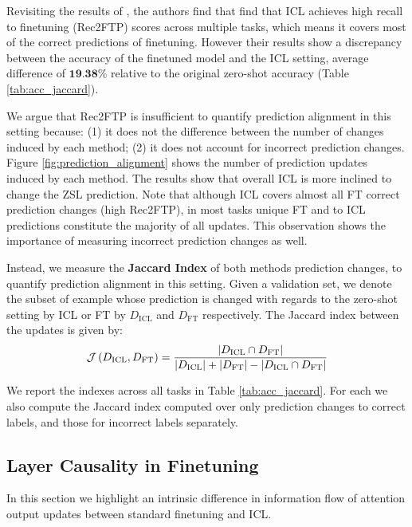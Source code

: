 Revisiting the results of \cite{dai2023gpt}, the authors find that find that ICL achieves high recall to finetuning (Rec2FTP) scores across multiple tasks, which means it covers most of the correct predictions of finetuning. 
However their results show a discrepancy between the accuracy of the finetuned model and the ICL setting, average difference of $\textbf{19.38\%}$ relative to the original zero-shot accuracy (Table \ref{tab:acc_jaccard}).


We argue that Rec2FTP is insufficient to quantify prediction alignment in this setting because:
(1) it does not the difference between the number of changes induced by each method;
(2) it does not account for incorrect prediction changes.
Figure \ref{fig:prediction_alignment} shows the number of prediction updates induced by each method.
The results show that overall ICL is more inclined to change the ZSL prediction.
Note that although ICL covers almost all FT correct prediction changes (high Rec2FTP), in most tasks unique FT and to ICL predictions constitute the majority of all updates.
This observation shows the importance of measuring incorrect prediction changes as well.

Instead, we measure the \textbf{Jaccard Index} of both methods prediction changes, to quantify prediction alignment in this setting.
Given a validation set, we denote the subset of example whose prediction is changed with regards to the zero-shot setting by ICL or FT by $D_\text{ICL}$ and $D_\text{FT}$ respectively.
The Jaccard index between the updates is given by: 
\begin{equation*}
  \mathcal{J}\left( D_\text{ICL}, D_\text{FT} \right) = \frac{\left|D_\text{ICL} \cap D_\text{FT}\right|}{\left|D_\text{ICL}\right| + \left|D_\text{FT}\right| - \left|D_\text{ICL} \cap D_\text{FT}\right|} 
\end{equation*}

We report the indexes across all tasks in Table \ref{tab:acc_jaccard}.
For each we also compute the Jaccard index computed over only prediction changes to correct labels, and those for incorrect labels separately.


\subsection{Layer Causality in Finetuning}
\label{sec:layer_causality}



In this section we highlight an intrinsic difference in information flow of attention output updates between standard finetuning and ICL.

